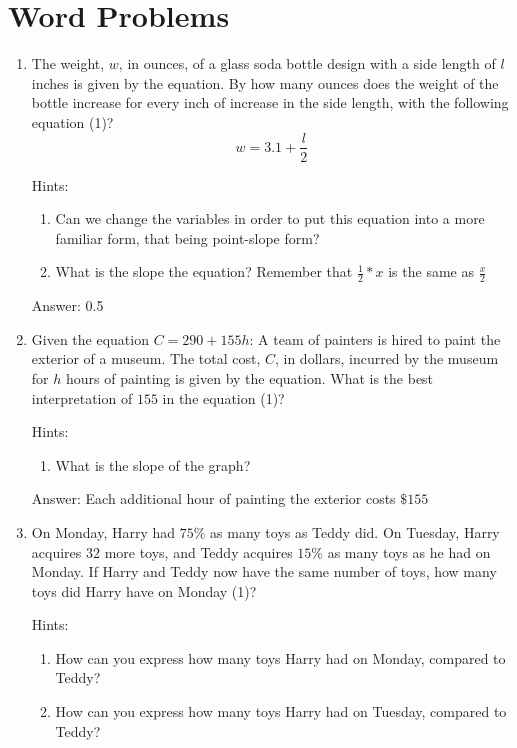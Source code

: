 \documentclass{article}
\begin{document}
\section{Word Problems}

\begin{enumerate}
	\item {The weight, $w$, in ounces, of a glass soda bottle design with a side length of $l$ inches is given by the equation. By how many ounces does the weight of the bottle increase for every inch of increase in the side length, with the following equation (1)? \[w=3.1 + \frac{l}{2}\]

	      Hints:
	      \begin{enumerate}
		      \item{Can we change the variables in order to put this equation into a more familiar form, that being point-slope form?}
		      \item{What is the slope the equation? Remember that \(\frac{1}{2}*x\) is the same as \(\frac{x}{2}\)}
	      \end{enumerate}

	      Answer: 0.5}
	\item {Given the equation $C = 290+155h$: A team of painters is hired to paint the exterior of a museum. The total cost, $C$, in dollars, incurred by the museum for $h$ hours of painting is given by the equation. What is the best interpretation of $155$ in the equation (1)?

	      Hints:
	      \begin{enumerate}
		      \item {What is the slope of the graph?}
	      \end{enumerate}

	      Answer: Each additional hour of painting the exterior costs $\$155$}
	\item {
	      On Monday, Harry had $75\%$ as many toys as Teddy did. On Tuesday, Harry acquires $32$ more toys, and Teddy acquires $15\%$ as many toys as he had on Monday. If Harry and Teddy now have the same number of toys, how many toys did Harry have on Monday (1)?

	      Hints:
	      \begin{enumerate}
		      \item {How can you express how many toys Harry had on Monday, compared to Teddy?}
		      \item {How can you express how many toys Harry had on Tuesday, compared to Teddy?}
	      \end{enumerate}

}
\end{enumerate}
\end{document}
